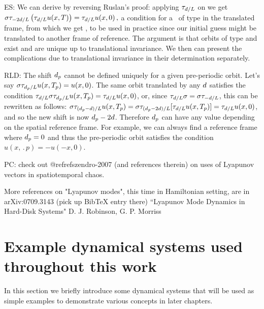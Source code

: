 ES:{ We can derive  by reversing Ruslan's proof:
applying $\tau_{d/L}$ on  we get
 $\sigma\tau_{-2d/L}\left(\tau_{d/L}u(x,T)\right)=\tau_{d/L}u(x,0)\,,$
a condition for a \rpo\ of type  in the translated frame, from which we get
, to be used in practice since our initial guess might be translated
to another frame of reference.
The argument is that orbits of type  and 
exist and are unique up to translational invariance.
We then can present the complications due to
translational invariance in their determination separately.
} %


RLD:{
    The shift $d_p$ cannot be defined
    uniquely for a given pre-periodic orbit.  Let's say
    $\sigma\tau_{d_p/L} u(x,{T_{p}}) = u(x,0)$.  The same
    orbit translated by any $d$ satisfies the condition
    $\tau_{d/L}\sigma\tau_{d_p/L} u(x,{T_{p}}) =
    \tau_{d/L}u(x,0)$, or, since $\tau_{d/L}\sigma = \sigma\tau_{-d/L}$,
    this can be rewritten as follows:
    $\sigma\tau_{(d_p - d)/L}u(x,{T_{p}}) =
    \sigma\tau_{(d_p - 2d)/L}[\tau_{d/L}u(x,{T_{p}})] =
    \tau_{d/L}u(x,0)$, and so the new shift is now $d_p - 2d$.  Therefore
    $d_p$ can have any value depending on the spatial reference frame.  For example,
    we can always find a reference frame where $d_p = 0$ and thus the pre-periodic
    orbit satisfies the condition $u(x,\period{p}) = -u(-x,0)$.
    }

PC: check out @refref{szendro-2007} (and references therein)
    on uses of Lyapunov vectors in spatiotemporal chaos.

More references on "Lyapunov modes", this time in Hamiltonian setting, are in
 arXiv:0709.3143 (pick up BibTeX entry there)
``Lyapunov Mode Dynamics in Hard-Disk Systems"
D. J. Robinson, G. P. Morriss


\section{Example dynamical systems used throughout this work}
    \label{s:exampleIntro}

In this section we briefly introduce some dynamical systems
that will be used as simple examples to demonstrate various
concepts in later chapters.

